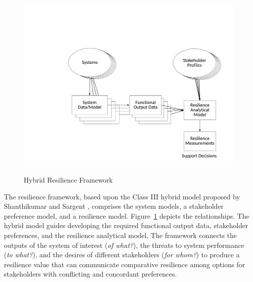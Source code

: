 \documentclass[preprint,12pt]{elsarticle}
\begin{document}
\begin{figure}
\begin{center}
\includegraphics[width=5in]{ClassIIIRes}
\end{center}
\renewcommand{\baselinestretch}{1}
\small\normalsize
\begin{quote}
\caption{Hybrid Resilience Framework}
\label{f:ClassIIIRes}
\end{quote}
\end{figure}


The resilience framework, based upon the Class III hybrid model
% 
% 
proposed by Shanthikumar and Sargent \cite{Shanthikumar1983},
comprises the system models, a stakeholder preference model, and a resilience
model. Figure~\ref{f:ClassIIIRes} depicts the
relationships. The hybrid model guides
developing the required functional output data, stakeholder
preferences, and the resilience analytical model. The framework connects  the
outputs of the system of interest (\emph{of what?}), the threats to system
performance (\emph{to what?}),
and the desires of different stakeholders (\emph{for whom?}) to produce a resilience
value that can communicate comparative resilience among options for
 stakeholders with conflicting and concordant preferences.
\end{document}

